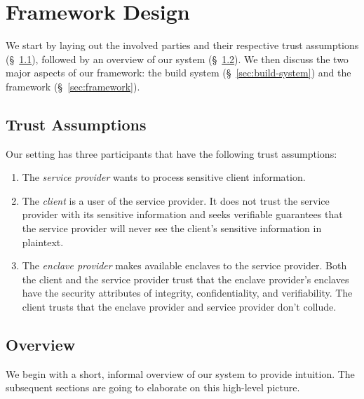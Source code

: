 \section{Framework Design}
\label{sec:design}

We start by laying out the involved parties and their respective trust
assumptions (\S~\ref{sec:trust-assumptions}), followed by an overview of our
system (\S~\ref{sec:overview}).  We then discuss the two major aspects of our
framework: the build system (\S~\ref{sec:build-system}) and the framework
(\S~\ref{sec:framework}).

\subsection{Trust Assumptions}
\label{sec:trust-assumptions}

Our setting has three participants that have the following trust assumptions:

\begin{enumerate}
    \item The \emph{service provider} wants to process sensitive client
      information.

    \item The \emph{client} is a user of the service provider.  It does not
      trust the service provider with its sensitive information and seeks
      verifiable guarantees that the service provider will never see the
      client's sensitive information in plaintext.

    \item The \emph{enclave provider} makes available enclaves to the service
      provider.  Both the client and the service provider trust that the
      enclave provider's enclaves have the security attributes of integrity,
      confidentiality, and verifiability.  The client trusts that the enclave
      provider and service provider don't collude.
\end{enumerate}

\subsection{Overview}
\label{sec:overview}

We begin with a short, informal overview of our system to provide intuition.
The subsequent sections are going to elaborate on this high-level picture.  


